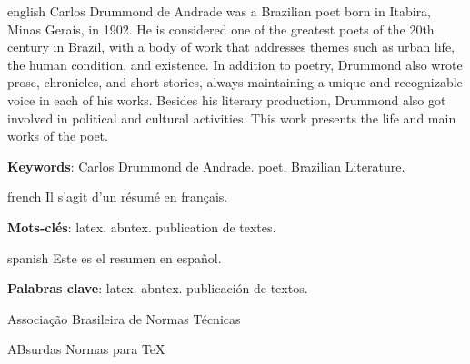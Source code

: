 \documentclass[12pt, openright,	oneside, a4paper, english, french, spanish, brazil]{abntex2}
\newcommand{\listofquadrosname}{Lista de quadros}
\begin{document}
\begin{resumo}[Abstract]
 \begin{otherlanguage*}{english}
   Carlos Drummond de Andrade was a Brazilian poet born in Itabira, Minas Gerais, in 1902. He is considered one of the greatest poets of the 20th century in Brazil, with a body of work that addresses themes such as urban life, the human condition, and existence. In addition to poetry, Drummond also wrote prose, chronicles, and short stories, always maintaining a unique and recognizable voice in each of his works. Besides his literary production, Drummond also got involved in political and cultural activities. This work presents the life and main works of the poet.

   \vspace{\onelineskip}
 
   \noindent 
   \textbf{Keywords}: Carlos Drummond de Andrade. poet. Brazilian Literature.
 \end{otherlanguage*}
\end{resumo}

\begin{resumo}[Résumé]
 \begin{otherlanguage*}{french}
    Il s'agit d'un résumé en français.
 
   \textbf{Mots-clés}: latex. abntex. publication de textes.
 \end{otherlanguage*}
\end{resumo}

\begin{resumo}[Resumen]
 \begin{otherlanguage*}{spanish}
   Este es el resumen en español.
  
   \textbf{Palabras clave}: latex. abntex. publicación de textos.
 \end{otherlanguage*}
\end{resumo}

\listoffigures*
\cleardoublepage

\pdfbookmark[0]{\listofquadrosname}{loq}
\listofquadros*
\cleardoublepage

\listoftables*
\cleardoublepage

\begin{siglas}
  \item[ABNT] Associação Brasileira de Normas Técnicas
  \item[abnTeX] ABsurdas Normas para TeX
\end{siglas}
\end{document}

